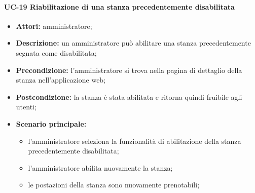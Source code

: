 \paragraph{UC-19 Riabilitazione di una stanza precedentemente disabilitata}
\begin{itemize}
    \item \textbf{Attori:} amministratore;
    \item \textbf{Descrizione:} un amministratore pu\`{o} abilitare una stanza precedentemente segnata come disabilitata;
    \item \textbf{Precondizione:} l'amministratore si trova nella pagina di dettaglio della stanza nell'applicazione web;
    \item \textbf{Postcondizione:} la stanza \`{e} stata abilitata e ritorna quindi fruibile agli utenti;
    \item \textbf{Scenario principale:}
    \begin{itemize}
        \item l'amministratore seleziona la funzionalità di abilitazione della stanza precedentemente disabilitata;
        \item l'amministratore abilita nuovamente la stanza;
        \item le postazioni della stanza sono nuovamente prenotabili;
    \end{itemize}
\end{itemize}